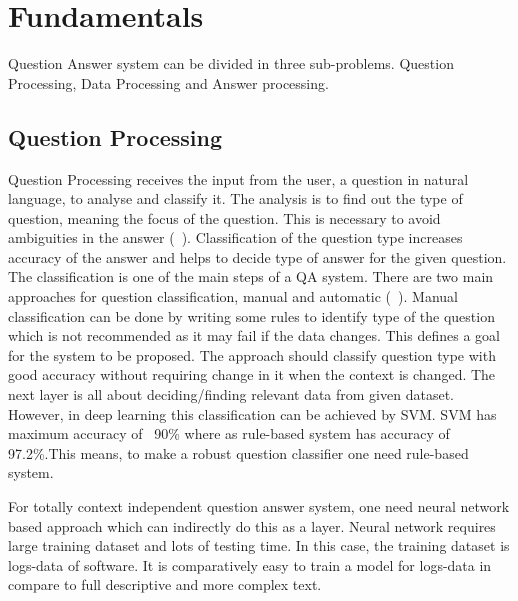 \newenvironment{mykeithtabbing}[1]{%
\begin{tabular}{lp{0.9\hsize}}
}{%
\end{tabular}
}

\newcommand{\mybadgood}[2]{%
\begin{mykeithtabbing}
{}\emph{Bad:}  & \sout{#1}  \\
\emph{Good:}   & #2  \\
\end{mykeithtabbing}

}

\chapter{Fundamentals}
\label{fundamentals}

 Question Answer system can be divided in three sub-problems. Question Processing, Data Processing and Answer processing. 
 
\section{Question Processing} 

 Question Processing receives the input from the user, a question in natural language, to analyse and classify it. The analysis is to find out the type of question, meaning the focus of the question. This is necessary to avoid ambiguities in the answer (~\cite{CALIJORNESOARES2018}). Classification of the question type increases accuracy of the answer and helps to decide type of answer for the given question. The classification is one of the main steps of a QA system. There are two main approaches for question classification, manual and automatic (~\cite{RAY20101935}). Manual classification can be done by writing some rules to identify type of the question which is not recommended as it may fail if the data changes. This defines a goal for the system to be proposed. The approach should classify question type with good accuracy without requiring change in it when the context is changed. The next layer is all about deciding/finding relevant data from given dataset. However, in deep learning this classification can be achieved by SVM. SVM has maximum accuracy of ~90\% where as rule-based system has accuracy of 97.2\%.This means, to make a robust question classifier one need rule-based system. 


\newpage
For totally context independent question answer system, one need neural network based approach which can indirectly do this as a layer. Neural network requires large training dataset and lots of testing time. In this case, the training dataset is logs-data of software. It is comparatively easy to train a model for logs-data in compare to full descriptive and more complex text.

